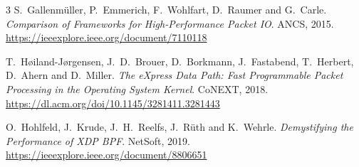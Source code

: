 \documentclass[10pt,a4paper]{article}
\begin{document}
\begin{thebibliography}{3}
\scriptsize
{}
S.~Gallenmüller, P.~Emmerich, F.~Wohlfart, D.~Raumer and G.~Carle.
\emph{Comparison of Frameworks for High-Performance Packet IO}. ANCS, 2015.
\url{https://ieeexplore.ieee.org/document/7110118}

T.~Høiland-Jørgensen, J.~D.~Brouer, D.~Borkmann, J.~Fastabend, T.~Herbert, D.~Ahern and D.~Miller.
\emph{The eXpress Data Path: Fast Programmable Packet Processing in the Operating System Kernel}. CoNEXT, 2018.
\url{https://dl.acm.org/doi/10.1145/3281411.3281443}

O.~Hohlfeld, J.~Krude, J.~H.~Reelfs, J.~Rüth and K.~Wehrle.
\emph{Demystifying the Performance of XDP BPF}. NetSoft, 2019.
\url{https://ieeexplore.ieee.org/document/8806651}
\end{thebibliography}
\end{document}
